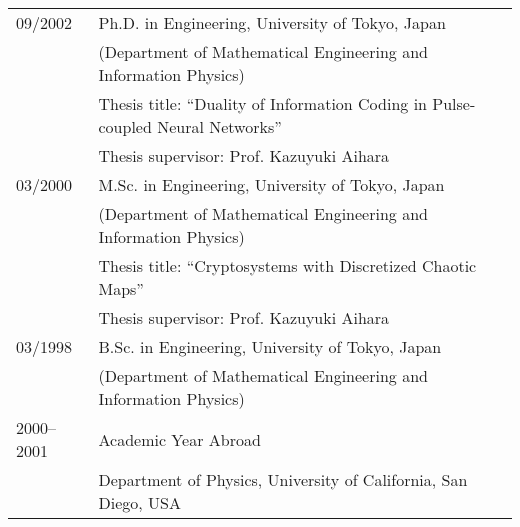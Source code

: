 \documentclass[11pt,letter]{article}
\renewenvironment{itemize}{
  \begin{list}{}{
    \setlength{\leftmargin}{1.5em}
    \setlength{\itemsep}{0.25em}
    \setlength{\parskip}{0pt}
    \setlength{\parsep}{0.25em}
  }
}{
  \end{list}
}
\begin{document}
\begin{tabular}{ll}
09/2002 & Ph.D. in Engineering, University of Tokyo, Japan\\
& (Department of Mathematical Engineering and Information Physics)\\
&    Thesis title: ``Duality of Information Coding in Pulse-coupled Neural Networks''\\%
&    Thesis supervisor: Prof. Kazuyuki Aihara\\
%
03/2000 & M.Sc. in Engineering, University of Tokyo, Japan\\
& (Department of Mathematical Engineering and Information Physics)\\
& Thesis title: ``Cryptosystems with Discretized Chaotic Maps''\\
& Thesis supervisor: Prof. Kazuyuki Aihara\\
%
03/1998 & B.Sc. in Engineering, University of Tokyo, Japan\\
& (Department of Mathematical Engineering and Information Physics)\\
%
2000--2001 & Academic Year Abroad\\
& Department of Physics, University of California, San Diego, USA
\end{tabular}

%
%
%
%
\end{document}

